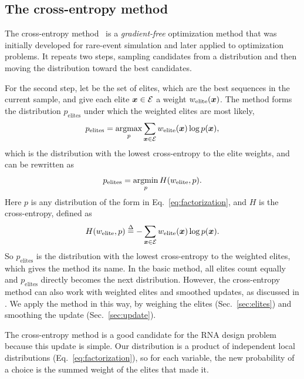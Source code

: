 

\subsection{The cross-entropy method}\label{sec:cem}
The cross-entropy method~\citep{rubinstein1999,deboer2005} is a {\em gradient-free} optimization method that was initially developed for rare-event simulation and later applied to optimization problems. It repeats two steps, sampling candidates from a distribution and then moving the distribution toward the best candidates.

For the second step, let \ELITES be the set of elites, which are the best sequences in the current sample, and give each elite $\boldsymbol{{x}}\in\mathcal{E}$ a weight $w_{\mathrm{elite}}(\boldsymbol{{x}})$. The method forms the distribution $p_{\mathrm{elites}}$ under which the weighted elites are most likely,
\begin{equation}
p_{\mathrm{elites}}=\argmax_{p}\sum_{\vecx\in\ELITES}w_{\mathrm{elite}}(\vecx)\log p(\vecx),
\label{eq:cefit}
\end{equation}
which is the distribution with the lowest cross-entropy to the elite weights, and can  be rewritten as
\begin{equation}
p_{\mathrm{elites}}=\argmin_{p}H(w_{\mathrm{elite}},p).
\label{eq:crossentropy}
\end{equation}
Here $p$ is any distribution of the form in Eq.~\ref{eq:factorization}, and $H$ is the cross-entropy, defined as
\begin{equation}
H(w_{\mathrm{elite}},p)\stackrel{\Delta}{=}-\sum_{\boldsymbol{{x}}\in\mathcal{E}}w_{\mathrm{elite}}(\boldsymbol{{x}})\log p(\boldsymbol{{x}}).
\label{eq:hdefinition}
\end{equation}
So $p_{\mathrm{elites}}$ is the distribution with the lowest cross-entropy to the weighted elites, which gives the method its name. In the basic method, all elites count equally and $p_{\mathrm{elites}}$ directly becomes the next distribution. However, the cross-entropy method can also work with weighted elites and smoothed updates, as discussed in \citet{deboer2005}. We apply the method in this way, by weighing the elites (Sec.~\ref{sec:elites}) and smoothing the update (Sec.~\ref{sec:update}).

The cross-entropy method is a good candidate for the RNA design problem because this update is simple. Our distribution is a product of independent local distributions (Eq.~\ref{eq:factorization}), so for each variable, the new probability of a choice is the summed weight of the elites that made it.

